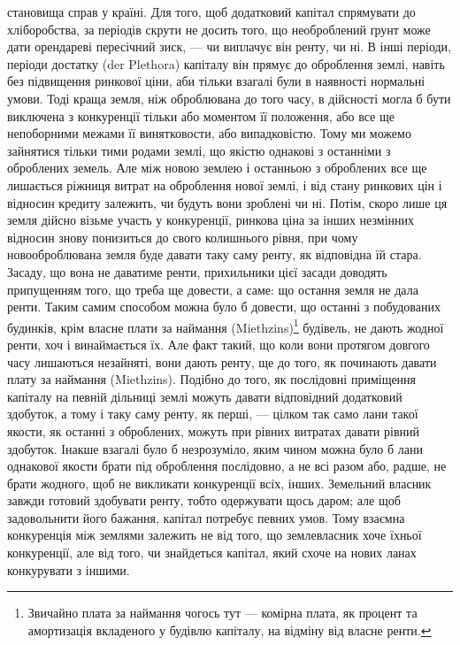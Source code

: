 \disablefootnotebreak{}
\parcont{}  %
становища справ у країні. Для того, щоб додатковий капітал спрямувати до
хліборобства, за періодів скрути не досить того, що необроблений ґрунт може
дати орендареві пересічний зиск, — чи виплачує він ренту, чи ні. В інші періоди,
періоди достатку (der Plethora) капіталу він прямує до оброблення землі, навіть
без підвищення ринкової ціни, аби тільки взагалі були в наявності нормальні
умови. Тоді краща земля, ніж оброблювана до того часу, в дійсності могла б
бути виключена з конкуренції тільки або моментом її положення, або все ще
непоборними межами її винятковости, або випадковістю. Тому ми можемо зайнятися
тільки тими родами землі, що якістю однакові з останніми з оброблених
земель. Але між новою землею і останньою з оброблених все ще лишається
ріжниця витрат на оброблення нової землі, і від стану ринкових цін і відносин
кредиту залежить, чи будуть вони зроблені чи ні. Потім, скоро лише ця земля
дійсно візьме участь у конкуренції, ринкова ціна за інших незмінних відносин
знову понизиться до свого колишнього рівня, при чому новооброблювана земля
буде давати таку саму ренту, як відповідна їй стара. Засаду, що вона не даватиме
ренти, прихильники цієї засади доводять припущенням того, що треба ще довести,
а саме: що остання земля не дала ренти. Таким самим способом можна було б довести,
що останні з побудованих будинків, крім власне плати за наймання (Miethzins)\footnote*{
Звичайно плата за наймання чогось тут — комірна плата, як процент та амортизація
вкладеного у будівлю капіталу, на відміну від власне ренти. 
}
будівель, не дають жодної ренти, хоч і винаймається їх. Але факт такий,
що коли вони протягом довгого часу лишаються незайняті, вони дають ренту, ще
до того, як починають давати плату за наймання (Miethzins). Подібно до того,
як послідовні приміщення капіталу на певній дільниці землі можуть давати
відповідний додатковий здобуток, а тому і таку саму ренту, як перші, — цілком
так само лани такої якости, як останні з оброблених, можуть при рівних витратах
давати рівний здобуток. Інакше взагалі було б незрозуміло, яким чином
можна було б лани однакової якости брати під оброблення послідовно, а не
всі разом або, радше, не брати жодного, щоб не викликати конкуренції всіх,
інших. Земельний власник завжди готовий здобувати ренту, тобто одержувати
щось даром; але щоб задовольнити його бажання, капітал потребує певних
умов. Тому взаємна конкуренція між землями залежить не від того, що землевласник
хоче їхньої конкуренції, але від того, чи знайдеться капітал, який
схоче на нових ланах конкурувати з іншими.
\enablefootnotebreak{}

